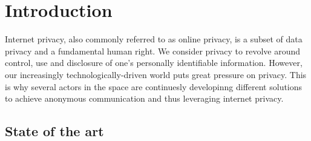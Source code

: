
\begin{abstract}

\end{abstract}
\section{Introduction}
Internet privacy, also commonly referred to as online privacy, is a subset of data privacy and a fundamental human right. We consider privacy to revolve around control, use and disclosure of one’s personally identifiable information.
However, our increasingly technologically-driven world puts great pressure on privacy. 
This is why several actors in the space are continuesly developinng different solutions to achieve anonymous communication and thus leveraging internet privacy.


\subsection{State of the art}

